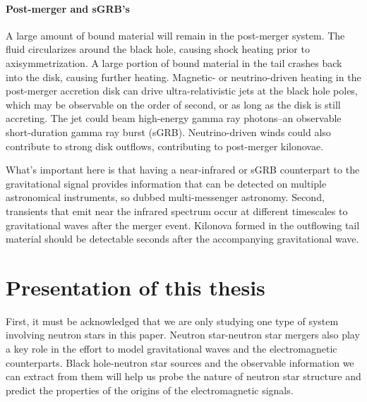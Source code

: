 \paragraph{Post-merger and sGRB's}
A large amount of bound material will remain in the post-merger system.  
The fluid circularizes around the black hole, causing shock heating prior to axisymmetrization. 
A large portion of bound material in the tail crashes back into the disk, causing further heating.
Magnetic- or neutrino-driven heating in the post-merger accretion disk can drive ultra-relativistic jets at the black hole poles, which may be observable on the order of second, or as long as the disk is still accreting.
The jet could beam high-energy gamma ray photons--an observable short-duration gamma ray burst (sGRB).
Neutrino-driven winds could also contribute to strong disk outflows, contributing to post-merger kilonovae.

What's important here is that having a near-infrared or sGRB counterpart to the gravitational signal provides information that can be detected on multiple astronomical instruments, so dubbed multi-messenger astronomy.
Second, transients that emit near the infrared spectrum occur at different timescales to gravitational waves after the merger event.
Kilonova formed in the outflowing tail material should be detectable seconds after the accompanying gravitational wave.  


\section{Presentation of this thesis}

First, it must be acknowledged that we are only studying one type of system involving neutron stars in this paper.  Neutron star-neutron star mergers also play a key role in the effort to model gravitational waves and the electromagnetic counterparts. 
Black hole-neutron star sources and the observable information we can extract from them will help us probe the nature of neutron star structure and predict the properties of the origins of the electromagnetic signals.

